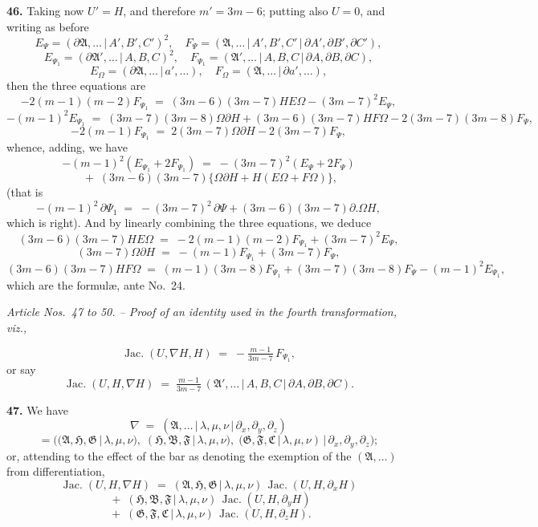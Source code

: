 \documentclass[11pt,a4paper]{article}
\providecommand{\mid}{\,|\,}
\providecommand{\Jac}{\operatorname{Jac.}}
\begin{document}
\textbf{46.} Taking now $U' = H$, and therefore $m' = 3m - 6$; putting also $U = 0$, and writing as before
\[
E_\Psi = (\partial\mathfrak{A},\ldots\mid A',B',C')^2,\quad F_\Psi = (\mathfrak{A},\ldots\mid A',B',C'\mid \partial A',\partial B',\partial C'),
\]
\[
E_{\Psi_1} = (\partial\mathfrak{A}',\ldots\mid A,B,C)^2,\quad F_{\Psi_1} = (\mathfrak{A}',\ldots\mid A,B,C\mid \partial A,\partial B,\partial C),
\]
\[
E_\Omega = (\partial\mathfrak{A},\ldots\mid a',\ldots),\quad F_\Omega = (\mathfrak{A},\ldots\mid \partial a',\ldots),
\]
then the three equations are
\[
-2(m-1)(m-2)F_{\Psi_1} \;=\; (3m-6)(3m-7)HE\Omega - (3m-7)^2 E_\Psi,
\]
\[
-(m-1)^2 E_{\Psi_1} \;=\; (3m-7)(3m-8)\Omega\partial H + (3m-6)(3m-7)HF\Omega - 2(3m-7)(3m-8)F_\Psi,
\]
\[
-2(m-1)F_{\Psi_1} \;=\; 2(3m-7)\Omega\partial H - 2(3m-7)F_\Psi,
\]
whence, adding, we have
\[
-(m-1)^2(E_{\Psi_1} + 2F_{\Psi_1}) \;=\; -(3m-7)^2(E_\Psi + 2F_\Psi)
\]
\[
\;+\; (3m-6)(3m-7)\bigl\{\Omega\partial H + H(E\Omega + F\Omega)\bigr\},
\]
(that is
\[
-(m-1)^2\,\partial\Psi_1 \;=\; -(3m-7)^2\,\partial\Psi + (3m-6)(3m-7)\partial.\Omega H,
\]
which is right). And by linearly combining the three equations, we deduce
\[
(3m-6)(3m-7)HE\Omega \;=\; -2(m-1)(m-2)F_{\Psi_1} + (3m-7)^2 E_\Psi,
\]
\[
(3m-7)\Omega\partial H \;=\; -(m-1)F_{\Psi_1} + (3m-7)F_\Psi,
\]
\[
(3m-6)(3m-7)HF\Omega \;=\; (m-1)(3m-8)F_{\Psi_1} + (3m-7)(3m-8)F_\Psi - (m-1)^2 E_{\Psi_1},
\]
which are the formul{\ae}, ante No.~24.

\bigskip

\begin{center}
\textit{Article Nos.\ 47 to 50. -- Proof of an identity used in the fourth transformation, viz.,}
\end{center}
\[
\Jac(U,\nabla H,H) \;=\; -\tfrac{m-1}{3m-7}\,F_{\Psi_1},
\]
or say
\[
\Jac(U,H,\nabla H) \;=\; \tfrac{m-1}{3m-7}\,(\mathfrak{A}',\ldots\mid A,B,C\mid \partial A,\partial B,\partial C).
\]

\textbf{47.} We have
\[
\nabla \;=\; (\mathfrak{A},\ldots\mid \lambda,\mu,\nu\mid \partial_x,\partial_y,\partial_z)
\]
\[
= \bigl((\mathfrak{A},\mathfrak{H},\mathfrak{G}\mid \lambda,\mu,\nu),\; (\mathfrak{H},\mathfrak{B},\mathfrak{F}\mid \lambda,\mu,\nu),\; (\mathfrak{G},\mathfrak{F},\mathfrak{C}\mid \lambda,\mu,\nu)\mid \partial_x,\partial_y,\partial_z\bigr);
\]
or, attending to the effect of the bar as denoting the exemption of the $(\mathfrak{A},\ldots)$ from differentiation,
\[
\Jac(U,H,\nabla H) \;=\; (\mathfrak{A},\mathfrak{H},\mathfrak{G}\mid \lambda,\mu,\nu)\,\Jac(U,H,\partial_x H)
\]
\[
\;+\; (\mathfrak{H},\mathfrak{B},\mathfrak{F}\mid \lambda,\mu,\nu)\,\Jac(U,H,\partial_y H)
\]
\[
\;+\; (\mathfrak{G},\mathfrak{F},\mathfrak{C}\mid \lambda,\mu,\nu)\,\Jac(U,H,\partial_z H).
\]
\end{document}
